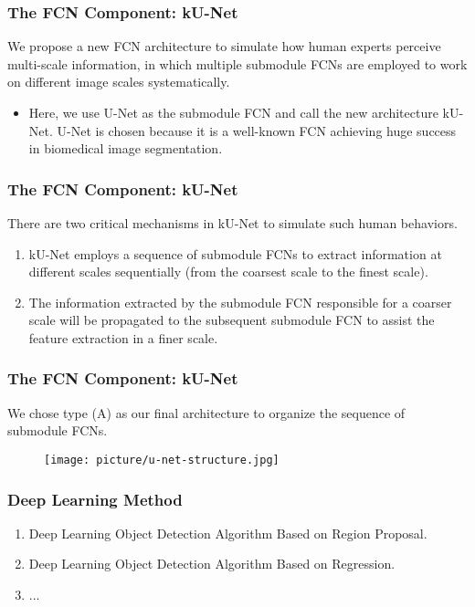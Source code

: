 \documentclass{beamer}
\begin{document}
\begin{frame}
  \frametitle{The FCN Component: kU-Net}
  We propose a new FCN architecture to simulate how human experts perceive multi-scale information,
  in which multiple submodule FCNs are employed to work on different image scales systematically.
  \begin{itemize}
  \item Here, we use U-Net as the submodule FCN and call the new architecture kU-Net. U-Net is chosen
    because it is a well-known FCN achieving huge success in biomedical image segmentation.
  \end{itemize}
\end{frame}  

\begin{frame}
  \frametitle{The FCN Component: kU-Net}
  There are two critical mechanisms in kU-Net to simulate such human behaviors.
  \begin{enumerate}
  \item kU-Net employs a sequence of submodule FCNs to extract information at different scales sequentially
    (from the coarsest scale to the finest scale). 
  \item The information extracted by the submodule FCN responsible for a coarser scale will be propagated to
    the subsequent submodule FCN to assist the feature extraction in a finer scale.
  \end{enumerate}
\end{frame}  

\begin{frame}
  \frametitle{The FCN Component: kU-Net}
  We chose type (A) as our final architecture to organize the sequence of submodule FCNs.
  \begin{figure}[!htb]
    \centering
    \texttt{[image: picture/u-net-structure.jpg]}
  \end{figure}
\end{frame}



\begin{frame}
  \frametitle{Deep Learning Method}
  \begin{block}{}
    \begin{enumerate}
    \item Deep Learning Object Detection Algorithm Based on Region Proposal.
      
    \item Deep Learning Object Detection Algorithm Based on Regression.
    \item ...
    \end{enumerate}
  \end{block}
\end{frame}
\end{document}
